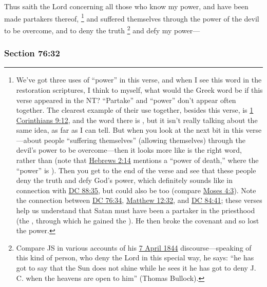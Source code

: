 		Thus saith the Lord concerning all those who know my power, and have been made partakers thereof,%
			\footnote{%
				We've got three uses of ``power'' in this verse, and when I see this word in the restoration scriptures, I think to myself, what would the Greek word be if this verse appeared in the NT? ``Partake'' and ``power'' don't appear often together. The clearest example of their use together, besides this verse, is \hyperref[1CORINTHIANS-9-12]{1 Corinthians 9:12}, and the word there is , but it isn't really talking about the same idea, as far as I can tell. But when you look at the next bit in this verse---about people ``suffering themselves'' (allowing themselves) through the devil's power to be overcome---then it looks more like  is the right word, rather than  (note that \hyperref[HEBREWS-2-14]{Hebrews 2:14} mentions a ``power of death,'' where the ``power'' is ). Then you get to the end of the verse and see that these people deny the truth and defy God's power, which definitely sounds like  in connection with \hyperref[DC88-35]{DC 88:35}, but could also be  too (compare \hyperref[MOSES-4-3]{Moses 4:3}). Note the connection between \hyperref[DC76-34]{DC 76:34}, \hyperref[MATTHEW-12-32]{Matthew 12:32}, and \hyperref[DC84-41]{DC 84:41}; these verses help us understand that Satan must have been a partaker in the priesthood (the , through which he gained the ). He then broke the covenant and so lost the power.
				} 
		and suffered themselves through the power of the devil to be overcome, and to deny the truth%
			\footnote{%
				Compare JS in various accounts of his \hyperref[EMS-1844-JS-7-APR-1844]{7 April 1844} discourse---speaking of this kind of person, who deny the Lord in this special way, he says: ``he has got to say that the Sun does not shine while he sees it he has got to deny J. C. when the heavens are open to him'' (Thomas Bullock).
				}
		and defy my power---


	\subsubsection{Section 76:32} %
		\label{DC76-32}

